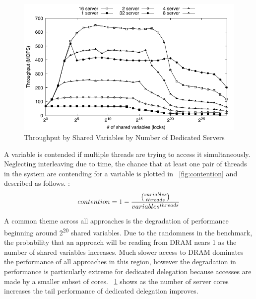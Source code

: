 \documentclass{uicthesi}
\begin{document}

\begin{figure}[ht!]
\centering
\includegraphics[width=0.9\columnwidth]{FIG/fetch_add_dedicated_vary_server.pdf}
\caption{Throughput by Shared Variables by Number of Dedicated Servers}
\label{fig:vary_server}
\end{figure}

A variable is contended if multiple threads are trying to access it simultaneously. Neglecting interleaving due to time, the chance that at least one pair of threads in the system are contending for a variable is plotted in ~\ref{fig:contention} and described as follows. : 
\begin{displaymath}
contention = 1 - {{ variables \choose threads }  \over  variables^{threads}}
\end{displaymath}

A common theme across all approaches is the degradation of performance beginning around 2\textsuperscript{20} shared variables. Due to the randomness in the benchmark, the probability that an approach will be reading from DRAM nears 1 as the number of shared variables increases. Much slower access to DRAM dominates the performance of all approaches in this region, however the degradation in performance is particularly extreme for dedicated delegation because accesses are made by a smaller subset of cores. ~\ref{fig:vary_server} shows as the number of server cores increases the tail performance of dedicated delegation improves. 
\end{document}
